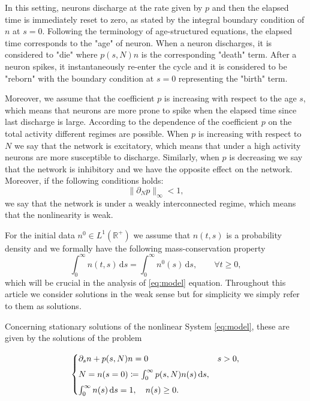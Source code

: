 \documentclass[11pt,a4paper]{article}
\newcommand{\R}{\mathbb{R}}
\newcommand{\dd}{\mathrm{d}}
\begin{document}
In this setting, neurons discharge at the rate given by $p$ and then the elapsed time is immediately reset to zero, as stated by the integral boundary condition of $n$ at $s = 0$. Following the terminology of age-structured equations, the elapsed time corresponds to the "age" of neuron. When a neuron discharges, it is considered to "die" where $p(s,N)n$ is the corresponding "death" term. After a neuron spikes, it instantaneously re-enter the cycle and it is considered to be "reborn" with the boundary condition at $s = 0$ representing the "birth" term.

Moreover, we assume that the coefficient $p$ is increasing with respect to the age $s$, which means that neurons are more prone to spike when the elapsed time since last discharge is large. According to the dependence of the coefficient $p$ on the total activity different regimes are possible. When $p$ is increasing with respect to $N$ we say that the network is excitatory, which means that under a high activity neurons are more susceptible to discharge. Similarly, when $p$ is decreasing we say that the network is inhibitory and we have the opposite effect on the network. Moreover, if the following conditions holds:
\begin{equation}
    \label{weakinter}
    \|\partial_N p\|_\infty<1,
\end{equation}
we say that the network is under a weakly interconnected regime, which means that the nonlinearity is weak. 

For the initial data $n^0\in L^1(\R^+)$ we assume that 
$n(t,s)$
is a probability density and we formally have the following mass-conservation property
\begin{equation}
\label{massconservation}
    \int_0^\infty n(t,s)\,\dd s = \int_0^\infty n^0(s)\,\dd s,\qquad\forall t\ge 0,
\end{equation}
which will be crucial in the analysis of \eqref{eq:model} equation. Throughout this article we consider solutions in the weak sense but for simplicity we simply refer to them as solutions.

Concerning stationary solutions of the nonlinear System \eqref{eq:model}, these are given by the solutions of the problem

\begin{equation}
\label{eqest1}
\begin{cases}
\partial_s n+p(s,N)n=0&s>0,\vspace{0.15cm}\\
N=n(s=0)\coloneqq\int_0^\infty p(s,N)n(s)\,\dd s,&\vspace{0.15cm}\\
\int_0^\infty n(s)\,\dd s=1,\quad n(s)\ge0.   
\end{cases}
\end{equation}
\end{document}
